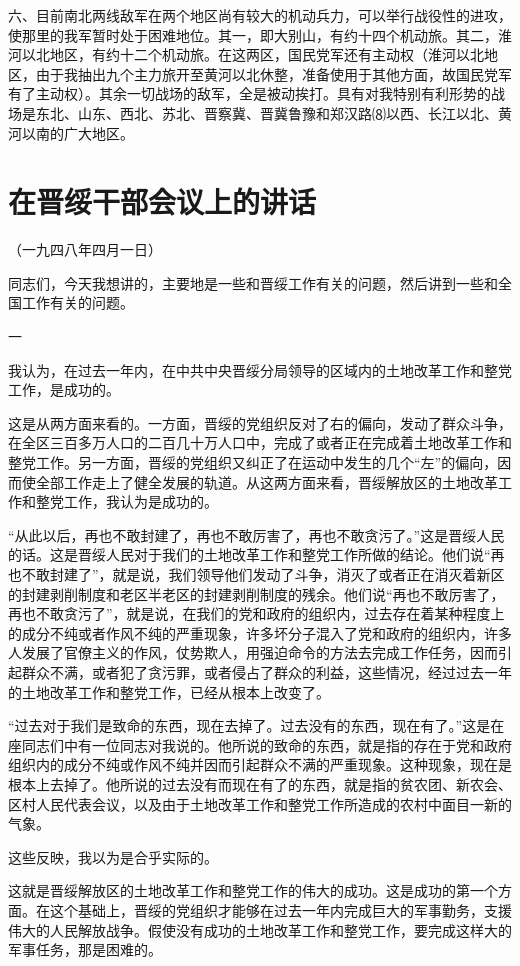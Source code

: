 \documentclass[UTF-8, a5paper, 12pt]{ctexart}
\begin{document}
六、目前南北两线敌军在两个地区尚有较大的机动兵力，可以举行战役性的进攻，使那里的我军暂时处于困难地位。其一，即大别山，有约十四个机动旅。其二，淮河以北地区，有约十二个机动旅。在这两区，国民党军还有主动权（淮河以北地区，由于我抽出九个主力旅开至黄河以北休整，准备使用于其他方面，故国民党军有了主动权）。其余一切战场的敌军，全是被动挨打。具有对我特别有利形势的战场是东北、山东、西北、苏北、晋察冀、晋冀鲁豫和郑汉路⑻以西、长江以北、黄河以南的广大地区。

\section{在晋绥干部会议上的讲话}

（一九四八年四月一日）

同志们，今天我想讲的，主要地是一些和晋绥工作有关的问题，然后讲到一些和全国工作有关的问题。

一

我认为，在过去一年内，在中共中央晋绥分局领导的区域内的土地改革工作和整党工作，是成功的。

这是从两方面来看的。一方面，晋绥的党组织反对了右的偏向，发动了群众斗争，在全区三百多万人口的二百几十万人口中，完成了或者正在完成着土地改革工作和整党工作。另一方面，晋绥的党组织又纠正了在运动中发生的几个“左”的偏向，因而使全部工作走上了健全发展的轨道。从这两方面来看，晋绥解放区的土地改革工作和整党工作，我认为是成功的。

“从此以后，再也不敢封建了，再也不敢厉害了，再也不敢贪污了。”这是晋绥人民的话。这是晋绥人民对于我们的土地改革工作和整党工作所做的结论。他们说“再也不敢封建了”，就是说，我们领导他们发动了斗争，消灭了或者正在消灭着新区的封建剥削制度和老区半老区的封建剥削制度的残余。他们说“再也不敢厉害了，再也不敢贪污了”，就是说，在我们的党和政府的组织内，过去存在着某种程度上的成分不纯或者作风不纯的严重现象，许多坏分子混入了党和政府的组织内，许多人发展了官僚主义的作风，仗势欺人，用强迫命令的方法去完成工作任务，因而引起群众不满，或者犯了贪污罪，或者侵占了群众的利益，这些情况，经过过去一年的土地改革工作和整党工作，已经从根本上改变了。

“过去对于我们是致命的东西，现在去掉了。过去没有的东西，现在有了。”这是在座同志们中有一位同志对我说的。他所说的致命的东西，就是指的存在于党和政府组织内的成分不纯或作风不纯并因而引起群众不满的严重现象。这种现象，现在是根本上去掉了。他所说的过去没有而现在有了的东西，就是指的贫农团、新农会、区村人民代表会议，以及由于土地改革工作和整党工作所造成的农村中面目一新的气象。

这些反映，我以为是合乎实际的。

这就是晋绥解放区的土地改革工作和整党工作的伟大的成功。这是成功的第一个方面。在这个基础上，晋绥的党组织才能够在过去一年内完成巨大的军事勤务，支援伟大的人民解放战争。假使没有成功的土地改革工作和整党工作，要完成这样大的军事任务，那是困难的。
\end{document}
